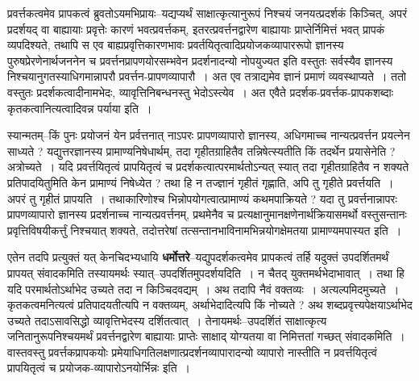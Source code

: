 \documentclass[article,12pt,a4paper]{memoir}
\begin{document}
	  \pstart प्रवर्त्तकत्वमेव प्रापकत्वं ब्रुवतोऽयमभिप्रायः--यद्यप्यर्थं साक्षात्कृत्यानुरूपं निश्चयं जनयत्प्रदर्शकं किञ्चित्, अपरं प्रदर्शयद् वा बाह्यायाः प्रवृत्तेः कारणं भवत्प्रवर्त्तकम्, इतरत्प्रवर्त्तनद्वारेण बाह्यायाः प्राप्तेर्निमित्तं भवत् प्रापकं व्यपदिश्यते, तथापि स एव बाह्यप्रवृत्तिकारणभावः प्रवर्तयितृत्वादिप्रयोजकव्यापाररूपो ज्ञानस्य पुरुषप्रेरणेनार्थजननेन च प्रवर्त्तनप्रापणयोरसम्भवेन प्रदर्शनादन्यो नोपयुज्यत इति वस्तुतः सर्वस्यैव ज्ञानस्य निश्चयानुगतस्याधिगमान्नापरौ प्रवर्त्तन-प्रापणव्यापारौ । अत एव तत्राद्यमेव ज्ञानं प्रमाणं व्यवस्थाप्यते । ततो वस्तुतः प्रदर्शकत्वादीनामभेदः, व्यावृत्तिनिबन्धनस्तु भेदोऽस्त्येव । अत एवैते प्रदर्शक-प्रवर्त्तक-प्रापकशब्दाः कृतकत्वानित्यत्वादिवन्न पर्याया इति ।
	\pend
      

	  \pstart स्यान्मतम्--किं पुनः प्रयोजनं येन प्रर्वत्तनात् नाऽपरः प्रापणव्यापारो ज्ञानस्य, अधिगमाच्च नान्यत्प्रवर्त्तन प्रयत्नेन साध्यते ? यद्युत्तरज्ञानस्य प्रामाण्यनिषेधार्थम्, तदा गृहीतग्राहितैव तन्निषेत्स्य\leavevmode{}तीति किं तदर्थेन प्रयासेनेति ? अत्रोच्यते । यदि प्रवर्त्तयितृत्वं प्रापयितृत्वं च प्रदर्शकत्वात्परमार्थतोऽन्यत् स्यात् तदा गृहीतग्राहितैव न शक्यते प्रतिपादयितुमिति केन प्रामाण्यं निषेध्येत ? तथा हि न तज्ज्ञानं गृहीतं गृह्णाति, अपि तु गृहीते प्रवर्त्तयति । अपरं तु गृहीतं प्रापयति । तथाकारिणोश्च भिन्नोपयोगत्वात्प्रामाण्यं कथमपाक्रियते ? यदा तु प्रवर्त्तनान्नापरः प्रापणव्यापारो ज्ञानस्य प्रदर्शनाच्च नान्यत्प्रवर्त्तनम्, प्रथमेनैव च प्रत्यक्षानुमानक्षणेनार्थक्रियासमर्थो वस्तुसन्तानः प्रवृत्तिविषयीकर्त्तुं निश्चयात् शक्यते, तदोत्तरेषां तत्सन्तानभाविनामभिन्नयोगक्षेमतया प्रामाण्यमपास्यत इति ।
	\pend
      

	  \pstart एतेन तदपि प्रत्युक्तं यत् केनचिदभ्यधायि \textbf{धर्मोत्तरे}--यद्युपदर्शकत्वमेव प्रापकत्वं तर्हि यदुक्तं उपदर्शितमर्थं प्रापयत् संवादकमिति तस्यायमर्थः स्यात्--उपदर्शितमुपदर्शयदिति । न चैतद् युक्तमर्थभेदाभावात् । तथा हि यदि परमार्थतोऽर्थाभेद उच्यते तदा न किञ्चिदवद्यम् । अथ तदापि नैवं वक्तव्यः । अत्यल्पमिदमुच्यते । कृतकत्वमनित्यत्वं प्रतिपादयतीत्यपि न वक्तव्यम्, अर्थाभेदादित्यपि किं नोच्यते ? अथ शब्दप्रवृत्त्यपेक्षयाऽर्थाभेद उच्यते तदाऽसावसिद्धो व्यावृत्तिभेदस्य दर्शितत्वात् । तेनायमर्थः--उपदर्शितं साक्षात्कृत्य जनितानुरूपनिश्चयमर्थं प्रवर्त्तनद्वारेण बाह्यायाः प्राप्तेः साक्षाद् योग्यतया वा निमित्ततां गच्छत् संवादकमिति । वास्तवस्तु प्रवर्त्तकप्रापकयोः प्रमेयाधिगतिलक्षणात्प्रदर्शनव्यापारादन्यो व्यापारो नास्तीति न प्रवर्त्तयितृत्वं प्रापयितृत्वं च प्रयोजक-व्यापारोऽनयोर्भिन्नः इति ।
	\pend
	  \bigskip
	  \begingroup
	
\end{document}
